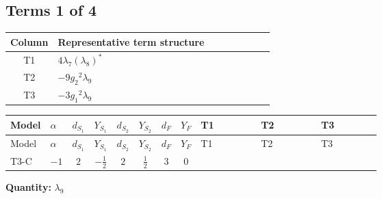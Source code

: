 \documentclass[8pt]{article}
\begin{document}
\begin{landscape}
\subsection*{Terms 1 of 4}
\begin{center}
\begin{tabular}{@{}c >{\raggedright\arraybackslash}p{0.82\linewidth}@{}}
\toprule
Column & Representative term structure \\
\midrule
T1 & \(\displaystyle 4 {\lambda_{7}} \left({\lambda_{8}}\right)^{*}\) \\
\midrule
T2 & \(\displaystyle -9 {g_2}^2 {\lambda_{9}}\) \\
\midrule
T3 & \(\displaystyle -3 {g_1}^2 {\lambda_{9}}\) \\
\midrule
\bottomrule
\end{tabular}
\end{center}
\smallskip
\tiny
\begin{longtable}{@{}llcccccc >{\raggedright\arraybackslash}p{0.21\linewidth} >{\raggedright\arraybackslash}p{0.21\linewidth} >{\raggedright\arraybackslash}p{0.21\linewidth}@{}}
\toprule
Model & $\alpha$ & $d_{S_1}$ & $Y_{S_1}$ & $d_{S_2}$ & $Y_{S_2}$ & $d_F$ & $Y_F$ & T1 & T2 & T3 \\
\midrule
\endfirsthead
\toprule
Model & $\alpha$ & $d_{S_1}$ & $Y_{S_1}$ & $d_{S_2}$ & $Y_{S_2}$ & $d_F$ & $Y_F$ & T1 & T2 & T3 \\
\midrule
\endhead
T3-C & $-1$ & $2$ & $-\frac{1}{2}$ & $2$ & $\frac{1}{2}$ & $3$ & $0$ & \scriptsize\adjustbox{max width=\linewidth}{$\begin{gathered} 4 {\lambda_{7}} \left({\lambda_{8}}\right)^{*}\end{gathered}$} & \scriptsize\adjustbox{max width=\linewidth}{$\begin{gathered} -9 {g_2}^2 {\lambda_{9}}\end{gathered}$} & \scriptsize\adjustbox{max width=\linewidth}{$\begin{gathered} -3 {g_1}^2 {\lambda_{9}}\end{gathered}$} \\
\midrule
\bottomrule
\end{longtable}
\clearpage
\noindent\textbf{Quantity: }$\lambda_{9}$\par\smallskip

\end{landscape}
\end{document}
